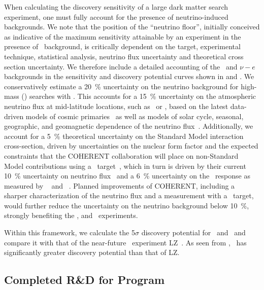 When calculating the discovery sensitivity of a large dark matter search experiment, one must fully account for the presence of neutrino-induced backgrounds.  We note that the position of the ``neutrino floor'', initially conceived as indicative of the maximum sensitivity attainable by an experiment in the presence of \CEnNS\ background, is critically dependent on the target, experimental technique, statistical analysis, neutrino flux uncertainty and theoretical cross section uncertainty. We therefore include a detailed accounting of the \CEnNS\ and $\nu-e$ backgrounds in the sensitivity and discovery potential curves shown in  and . We conservatively estimate a \SI{20}{\percent} uncertainty on the neutrino background for high-mass (\DSkHighMassThreshold) searches with \Argo.  This accounts for a \SI{15}{\percent} uncertainty on the atmospheric neutrino flux at mid-latitude locations, such as \SNOLAB\ or \LNGS, based on the latest data-driven models of cosmic primaries~\cite{Evans:2017hu} as well as models of solar cycle, seasonal, geographic, and geomagnetic dependence of the neutrino flux~\cite{Honda:2011ey,Barr:2006ih}.  Additionally, we account for a \SI{5}{\percent} theoretical uncertainty on the Standard Model interaction cross-section, driven by uncertainties on the nuclear form factor and the expected constraints that the COHERENT collaboration will place on non-Standard Model contributions using a \LAr\ target~\cite{Tayloe:2018jn}, which in turn is driven by their current \SI{10}{\percent} uncertainty on neutrino flux~\cite{Akimov:2017bs} and a \SI{6}{\percent} uncertainty on the \LAr\ response as measured by \SCENE~\cite{Cao:2015ks,Alexander:2013ke} and \ARIS~\cite{Agnes:2018cn}.  Planned improvements of COHERENT, including a sharper characterization of the neutrino flux and a measurement with a \LAr\ target, would further reduce the uncertainty on the neutrino background below \SI{10}{\percent}, strongly benefiting the \DSks, and \Argo\ experiments.

Within this framework, we calculate the 5$\sigma$ discovery potential for \DSks\ and \Argo\ and compare it with that of the near-future \LXe\ experiment LZ~\cite{Dobson:2018us}.  As seen from , \DSks\ has significantly greater discovery potential than that of LZ.


\subsection{Completed R\&D for \DSks Program}
\label{sec:technologies}

